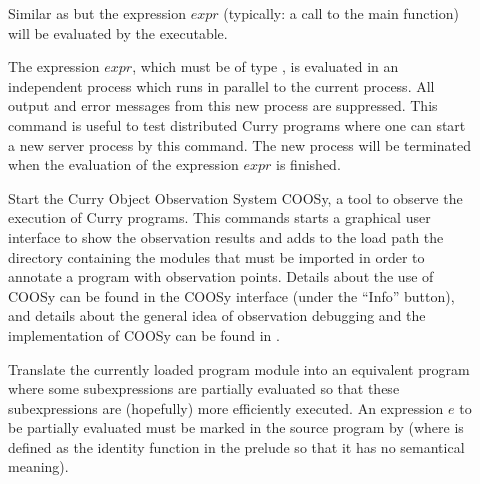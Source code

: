 \begin{description}
\item[] Similar as 
but the expression $expr$ (typically: a call to the main
function) will be evaluated by the executable.

\item[]
The expression $expr$, which must be of type ,
is evaluated in an independent process which runs in
parallel to the current \CYS process.
All output and error messages from this new process are suppressed.
This command is useful to test distributed Curry programs
where one can start
a new server process by this command. The new process
will be terminated when the evaluation of the expression $expr$
is finished.

\item[]
Start the Curry Object Observation System COOSy,
a tool to observe the execution of Curry programs.
This commands starts a graphical user interface to show
the observation results and adds to the load path the directory
containing the modules that must be imported in order to annotate
a program with observation points.
Details about the use of COOSy can be found in the
COOSy interface (under the ``Info'' button), and details
about the general idea of observation debugging and the implementation
of COOSy can be found in \cite{BrasselChitilHanusHuch04PADL}.


\item[]
Translate the currently loaded program module into an equivalent
program where some subexpressions are partially evaluated
so that these subexpressions are (hopefully) more efficiently executed.
An expression $e$ to be partially evaluated
must be marked in the source program by 
(where  is defined as the identity function in the prelude
so that it has no semantical meaning).


\end{description}
